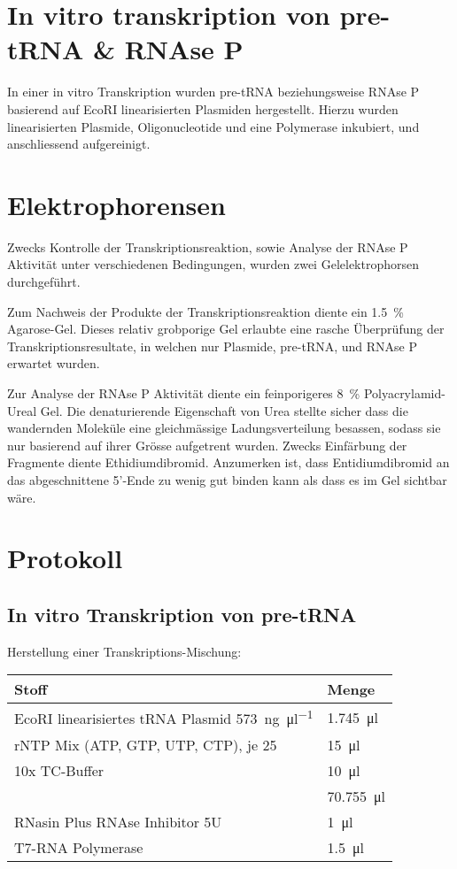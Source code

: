 \documentclass[a4paper,english]{scrreprt}
\begin{document}
\section{In vitro transkription von pre-tRNA \& RNAse P}

In einer in vitro Transkription wurden pre-tRNA beziehungsweise RNAse P
basierend auf EcoRI linearisierten Plasmiden hergestellt. Hierzu wurden
linearisierten Plasmide, Oligonucleotide und eine Polymerase inkubiert, und
anschliessend aufgereinigt.

\section{Elektrophorensen}

Zwecks Kontrolle der Transkriptionsreaktion, sowie Analyse der RNAse P
Aktivität unter verschiedenen Bedingungen, wurden zwei Gelelektrophorsen
durchgeführt.

Zum Nachweis der Produkte der Transkriptionsreaktion diente ein
\SI{1.5}{\percent} Agarose-Gel. Dieses relativ grobporige Gel erlaubte eine
rasche Überprüfung der Transkriptionsresultate, in welchen nur Plasmide,
pre-tRNA, und RNAse P erwartet wurden.

Zur Analyse der RNAse P Aktivität diente ein feinporigeres \SI{8}{\percent}
Polyacrylamid-Ureal Gel. Die denaturierende Eigenschaft von Urea stellte sicher
dass die wandernden Moleküle eine gleichmässige Ladungsverteilung besassen,
sodass sie nur basierend auf ihrer Grösse aufgetrent wurden. Zwecks Einfärbung
der Fragmente diente Ethidiumdibromid. Anzumerken ist, dass Entidiumdibromid an
das abgeschnittene 5'-Ende zu wenig gut binden kann als dass es im Gel sichtbar
wäre.

\section{Protokoll\cite{skriptv1}}

\subsection{In vitro Transkription von pre-tRNA}

Herstellung einer Transkriptions-Mischung:
\\

\begin{tabu}{ll}
	\toprule
	Stoff & Menge \\
	\midrule
	EcoRI linearisiertes tRNA Plasmid \SI{573}{\ng \per \ul} & \SI{1.745}{\ul} \\
	rNTP Mix (ATP, GTP, UTP, CTP), je \SI{25}{\milli\Molar} & \SI{15}{\ul} \\
	10x TC-Buffer & \SI{10}{\ul} \\
	 & \SI{70.755}{\ul} \\
	RNasin Plus RNAse Inhibitor 5U & \SI{1}{\ul} \\
	T7-RNA Polymerase & \SI{1.5}{\ul} \\
	\bottomrule
\end{tabu}
\\
\end{document}
